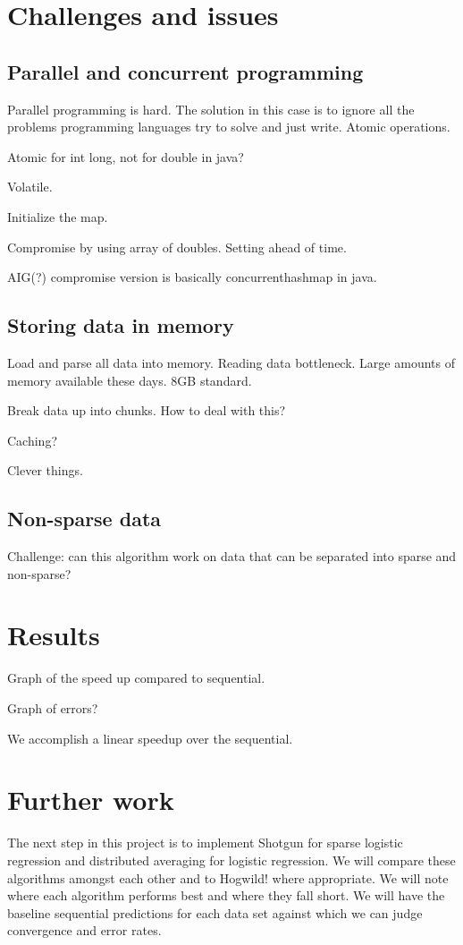 \documentclass{article} %
\begin{document}
\section{Challenges and issues}
\label{gen_inst}
\subsection{Parallel and concurrent programming}
Parallel programming is hard. The solution in this case is to ignore all the problems programming languages try to solve and just write. Atomic operations.

Atomic for int long, not for double in java?

Volatile.

Initialize the map.

Compromise by using array of doubles. Setting ahead of time.

AIG(?) compromise version is basically concurrenthashmap in java.



\subsection{Storing data in memory}
Load and parse all data into memory. Reading data bottleneck. Large amounts of memory available these days. 8GB standard.

Break data up into chunks. How to deal with this?

Caching?

Clever things.

\subsection{Non-sparse data}
Challenge: can this algorithm work on data that can be separated into sparse and non-sparse?

\section{Results}
Graph of the speed up compared to sequential.

Graph of errors?

We accomplish a linear speedup over the sequential.

\section{Further work}
The next step in this project is to implement Shotgun for sparse logistic regression and distributed averaging for logistic regression. We will compare these algorithms amongst each other and to Hogwild! where appropriate. We will note where each algorithm performs best and where they fall short. We will have the baseline sequential predictions for each data set against which we can judge convergence and error rates.
\end{document}
